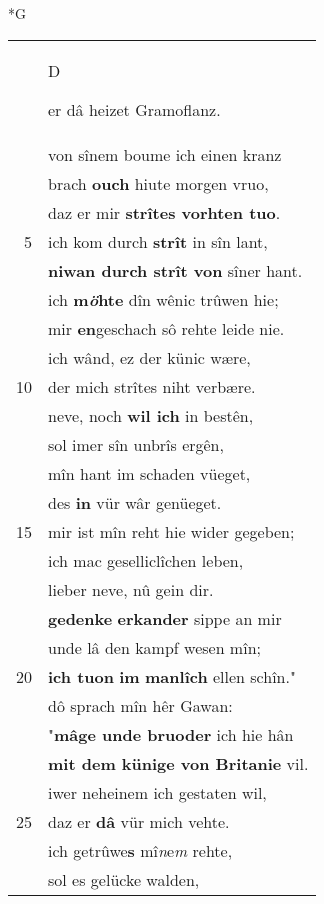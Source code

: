 \documentclass[8pt,a4paper,notitlepage]{article}
\begin{document}
\begin{table}[ht]
\begin{minipage}[t]{0.5\linewidth}
\small
\begin{center}*G
\end{center}
\begin{tabular}{rl}
 & \begin{large}D\end{large}er dâ heizet Gramoflanz.\\ 
 & von sînem boume ich einen kranz\\ 
 & brach \textbf{ouch} hiute morgen vruo,\\ 
 & daz er mir \textbf{strîtes vorhten tuo}.\\ 
5 & ich kom durch \textbf{strît} in sîn lant,\\ 
 & \textbf{niwan durch strît von} sîner hant.\\ 
 & ich \textbf{m\textit{ö}hte} dîn wênic trûwen hie;\\ 
 & mir \textbf{en}geschach sô rehte leide nie.\\ 
 & ich wând, ez der künic wære,\\ 
10 & der mich strîtes niht verbære.\\ 
 & neve, noch \textbf{wil ich} in bestên,\\ 
 & sol imer sîn unbrîs ergên,\\ 
 & mîn hant im schaden vüeget,\\ 
 & des \textbf{in} vür wâr genüeget.\\ 
15 & mir ist mîn reht hie wider gegeben;\\ 
 & ich mac geselliclîchen leben,\\ 
 & lieber neve, nû gein dir.\\ 
 & \textbf{gedenke} \textbf{erkander} sippe an mir\\ 
 & unde lâ den kampf wesen mîn;\\ 
20 & \textbf{ich tuon} \textbf{im} \textbf{manlîch} ellen schîn."\\ 
 & dô sprach mîn hêr Gawan:\\ 
 & "\textbf{mâge unde bruoder} ich hie hân\\ 
 & \textbf{mit dem künige von Britanie} vil.\\ 
 & iwer neheinem ich gestaten wil,\\ 
25 & daz er \textbf{dâ} vür mich vehte.\\ 
 & ich getrûwe\textbf{s} mî\textit{n}e\textit{m} rehte,\\ 
 & sol es gelücke walden,\\ 

\end{tabular}
\end{minipage}
\end{table}
\end{document}
